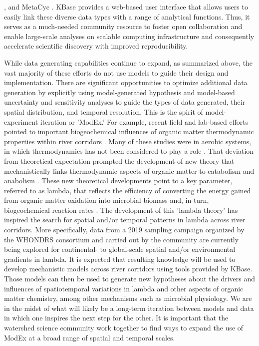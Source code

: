 \documentclass[preprint,review, 12pt]{elsarticle}
\begin{document}
\citep{Schellenberger2010}, and MetaCyc \citep{Caspi2006}. KBase provides a web-based user interface that allows users to easily link these diverse data types with a range of analytical functions. Thus, it serves as a much-needed community resource to foster open collaboration and enable large-scale analyses on scalable computing infrastructure and consequently accelerate scientific discovery with improved reproducibility. 

While data generating capabilities continue to expand, as summarized above, the vast majority of these efforts do not use models to guide their design and implementation. There are significant opportunities to optimize additional data generation by explicitly using model-generated hypothesis and model-based uncertainty and sensitivity analyses to guide the types of data generated, their spatial distribution, and temporal resolution. This is the spirit of model-experiment iteration or 'ModEx.' For example, recent field and lab-based efforts pointed to important biogeochemical influences of organic matter thermodynamic properties within river corridors \citep{Stegen2018,Graham2018,Graham2017d,Garayburu-Caruso2020,Boye2017}. Many of these studies were in aerobic systems, in which thermodynamics has not been considered to play a role \citep{jin_new_2003}. That deviation from theoretical expectation prompted the development of new theory that mechanistically links thermodynamic aspects of organic matter to catabolism and anabolism \citep{song_representing_2020}. These new theoretical developments point to a key parameter, referred to as lambda, that reflects the efficiency of converting the energy gained from organic matter oxidation into microbial biomass and, in turn, biogeochemical reaction rates \citep{song_representing_2020}. The development of this 'lambda theory' has inspired the search for spatial and/or temporal patterns in lambda across river corridors. More specifically, data from a 2019 sampling campaign organized by the WHONDRS consortium \citep{stegen_whondrs_2018,WHONDRS_S19S_DATA} and carried out by the community are currently being explored for continental- to global-scale spatial and/or environmental gradients in lambda. It is expected that resulting knowledge will be used to develop mechanistic models across river corridors using tools provided by KBase. Those models can then be used to generate new hypotheses about the drivers and influences of spatiotemporal variations in lambda and other aspects of organic matter chemistry, among other mechanisms such as microbial physiology. We are in the midst of what will likely be a long-term iteration between models and data in which one inspires the next step for the other. It is important that the watershed science community work together to find ways to expand the use of ModEx at a broad range of spatial and temporal scales.
 
\end{document}
